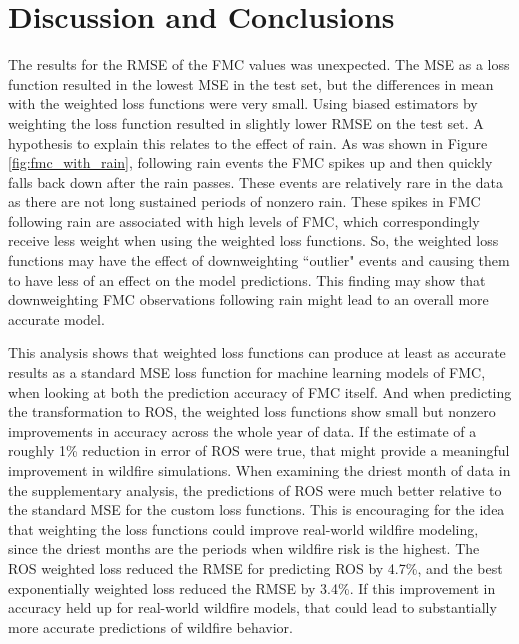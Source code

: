 \documentclass[11pt]{article}%
\begin{document}
\section{Discussion and Conclusions}

The results for the RMSE of the FMC values was unexpected. The MSE as a loss function resulted in the lowest MSE in the test set, but the differences in mean with the weighted loss functions were very small. Using biased estimators by weighting the loss function resulted in slightly lower RMSE on the test set. A hypothesis to explain this relates to the effect of rain. As was shown in Figure \ref{fig:fmc_with_rain}, following rain events the FMC spikes up and then quickly falls back down after the rain passes. These events are relatively rare in the data as there are not long sustained periods of nonzero rain. These spikes in FMC following rain are associated with high levels of FMC, which correspondingly receive less weight when using the weighted loss functions. So, the weighted loss functions may have the effect of downweighting ``outlier" events and causing them to have less of an effect on the model predictions. This finding may show that downweighting FMC observations following rain might lead to an overall more accurate model.

This analysis shows that weighted loss functions can produce at least as accurate results as a standard MSE loss function for machine learning models of FMC, when looking at both the prediction accuracy of FMC itself. And when predicting the transformation to ROS, the weighted loss functions show small but nonzero improvements in accuracy across the whole year of data. If the estimate of a roughly 1\% reduction in error of ROS were true, that might provide a meaningful improvement in wildfire simulations. When examining the driest month of data in the supplementary analysis, the predictions of ROS were much better relative to the standard MSE for the custom loss functions. This is encouraging for the idea that weighting the loss functions could improve real-world wildfire modeling, since the driest months are the periods when wildfire risk is the highest. The ROS weighted loss reduced the RMSE for predicting ROS by 4.7\%, and the best exponentially weighted loss reduced the RMSE by 3.4\%. If this improvement in accuracy held up for real-world wildfire models, that could lead to substantially more accurate predictions of wildfire behavior.
\end{document}
